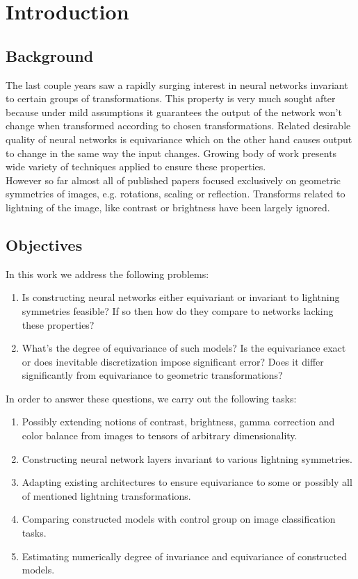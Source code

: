\section{Introduction}
\subsection{Background}
The last couple years saw a rapidly surging interest in neural networks
invariant to certain groups of transformations. This property
is very much sought after because under mild assumptions it
guarantees the output of the network won't change when transformed according to
chosen
transformations. Related desirable quality of neural networks is equivariance
which on the other hand causes output to change in the same way the input
changes. Growing body of work presents wide variety of
techniques applied to ensure these properties.
\\ However so far almost all of published papers focused exclusively on
geometric symmetries of images, e.g. rotations, scaling or reflection. Transforms
related to lightning of the image, like contrast or brightness have been largely
ignored.
\subsection{Objectives}
In this work we address the following problems:
\begin{enumerate}
    \item Is constructing neural networks either equivariant or invariant to
        lightning symmetries feasible? If so then how do they compare to networks
        lacking these properties?
    \item What's the degree of equivariance of such models? Is the equivariance
        exact or does inevitable discretization impose significant error?
        Does it differ significantly from equivariance to geometric
        transformations?
\end{enumerate}
In order to answer these questions, we carry out the following tasks:
\begin{enumerate}
    \item Possibly extending notions of contrast, brightness, gamma correction 
        and color balance from
        images to tensors of arbitrary dimensionality.
    \item Constructing neural network layers invariant to various lightning
        symmetries.
    \item Adapting existing architectures to ensure equivariance to some or
        possibly all of mentioned lightning transformations.
    \item Comparing constructed models with control group on image
        classification tasks.
    \item Estimating numerically degree of invariance and equivariance of constructed models.
\end{enumerate}

